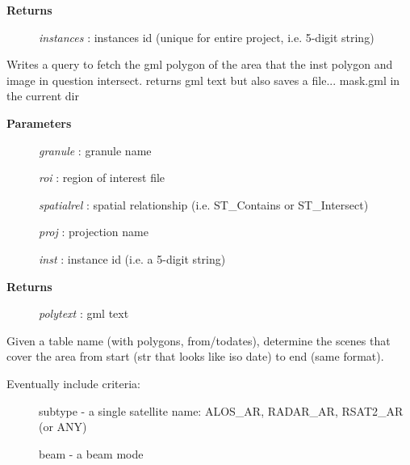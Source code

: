 \documentclass[letterpaper,10pt,english]{sphinxmanual}
\begin{document}
\begin{fulllineitems}
\begin{fulllineitems}
\begin{description}
\item[{\textbf{Returns}}] \leavevmode
\emph{instances} :   instances id (unique for entire project, i.e. 5-digit string)

\end{description}

\end{fulllineitems}


\begin{fulllineitems}
\label{code:Database.Database.qryMaskZone}
Writes a query to fetch the gml polygon of the area that the inst polygon and
image in question intersect.
returns gml text but also saves a file... mask.gml in the current dir
\begin{description}
\item[{\textbf{Parameters}}] \leavevmode
\emph{granule} : granule name

\emph{roi}   :   region of interest file

\emph{spatialrel}    :   spatial relationship (i.e. ST\_Contains or ST\_Intersect)

\emph{proj}  :   projection name

\emph{inst}  :   instance id (i.e. a 5-digit string)

\item[{\textbf{Returns}}] \leavevmode
\emph{polytext}  :   gml text

\end{description}

\end{fulllineitems}


\begin{fulllineitems}
\label{code:Database.Database.qrySelectFromArchive}
Given a table name (with polygons, from/todates), determine the scenes that cover the area
from start (str that looks like iso date) to end (same format).
\begin{description}
\item[{Eventually include criteria:}] \leavevmode
subtype - a single satellite name: ALOS\_AR, RADAR\_AR, RSAT2\_AR (or ANY)

beam - a beam mode


\end{description}
\end{fulllineitems}
\end{fulllineitems}
\end{document}
